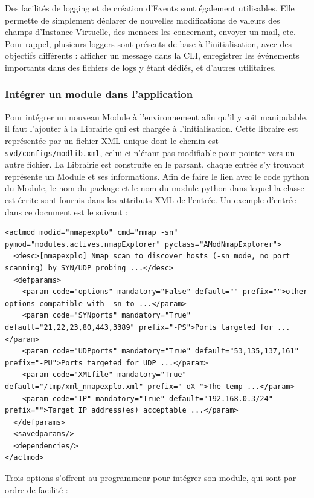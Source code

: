 \documentclass[]{article}
\begin{document}
\par Des facilités de logging et de création d'Events sont également utilisables. Elle permette de simplement déclarer de nouvelles modifications de valeurs des champs d'Instance Virtuelle, des menaces les concernant, envoyer un mail, etc. Pour rappel, plusieurs loggers sont présents de base à l'initialisation, avec des objectifs différents : afficher un message dans la CLI, enregistrer les événements importants dans des fichiers de logs y étant dédiés, et d'autres utilitaires.

\newpage

\subsubsection{Intégrer un module dans l'application}

Pour intégrer un nouveau Module à l'environnement afin qu'il y soit manipulable, il faut l'ajouter à la Librairie qui est chargée à l'initialisation. Cette libraire est représentée par un fichier XML unique dont le chemin est \texttt{svd/configs/modlib.xml}, celui-ci n'étant pas modifiable pour pointer vers un autre fichier. La Librairie est construite en le parsant, chaque entrée s'y trouvant représente un Module et ses informations. Afin de faire le lien avec le code python du Module, le nom du package et le nom du module python dans lequel la classe est écrite sont fournis dans les attributs XML de l'entrée. Un exemple d'entrée dans ce document est le suivant :
\small{
\lstset{language=XML}
\begin{lstlisting}
<actmod modid="nmapexplo" cmd="nmap -sn" pymod="modules.actives.nmapExplorer" pyclass="AModNmapExplorer">
  <desc>[nmapexplo] Nmap scan to discover hosts (-sn mode, no port scanning) by SYN/UDP probing ...</desc>
  <defparams>
    <param code="options" mandatory="False" default="" prefix="">other options compatible with -sn to ...</param>
    <param code="SYNports" mandatory="True" default="21,22,23,80,443,3389" prefix="-PS">Ports targeted for ...</param>
    <param code="UDPports" mandatory="True" default="53,135,137,161" prefix="-PU">Ports targeted for UDP ...</param>
    <param code="XMLfile" mandatory="True" default="/tmp/xml_nmapexplo.xml" prefix="-oX ">The temp ...</param>
    <param code="IP" mandatory="True" default="192.168.0.3/24" prefix="">Target IP address(es) acceptable ...</param>
  </defparams>
  <savedparams/>
  <dependencies/>
</actmod>
\end{lstlisting}
}

Trois options s'offrent au programmeur pour intégrer son module, qui sont par ordre de facilité :
\end{document}

